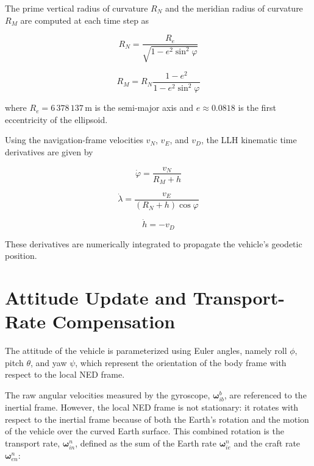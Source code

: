 \documentclass[a4paper,twoside,openany]{report}
\begin{document}
The prime vertical radius of curvature $R_N$ and the meridian radius of curvature $R_M$ are computed at each time step as

\begin{equation}
    R_N = \frac{R_e}{\sqrt{1 - e^2 \sin^2\varphi}}
    \label{eq:RN}
\end{equation}

\begin{equation}
    R_M = R_N \frac{1 - e^2}{1 - e^2 \sin^2\varphi}
    \label{eq:RM}
\end{equation}

where $R_e = 6\,378\,137\,\mathrm{m}$ is the semi-major axis and $e \approx 0.0818$ is the first eccentricity of the ellipsoid.

Using the navigation-frame velocities $v_N$, $v_E$, and $v_D$, the LLH kinematic time derivatives are given by

\begin{equation}
    \dot{\varphi} = \frac{v_N}{R_M + h}
    \label{eq:phi_dot}
\end{equation}

\begin{equation}
    \dot{\lambda} = \frac{v_E}{(R_N + h)\cos\varphi}
    \label{eq:lambda_dot}
\end{equation}

\begin{equation}
    \dot{h} = -v_D
    \label{eq:h_dot}
\end{equation}

These derivatives are numerically integrated to propagate the vehicle's geodetic position.

\section{Attitude Update and Transport-Rate Compensation}

The attitude of the vehicle is parameterized using Euler angles, namely roll $\phi$, pitch $\theta$, and yaw $\psi$, which represent the orientation of the body frame with respect to the local NED frame.

The raw angular velocities measured by the gyroscope, $\boldsymbol{\omega}_{ib}^b$, are referenced to the inertial frame. However, the local NED frame is not stationary: it rotates with respect to the inertial frame because of both the Earth's rotation and the motion of the vehicle over the curved Earth surface. This combined rotation is the transport rate, $\boldsymbol{\omega}_{in}^n$, defined as the sum of the Earth rate $\boldsymbol{\omega}_{ie}^n$ and the craft rate $\boldsymbol{\omega}_{en}^n$:
\end{document}
